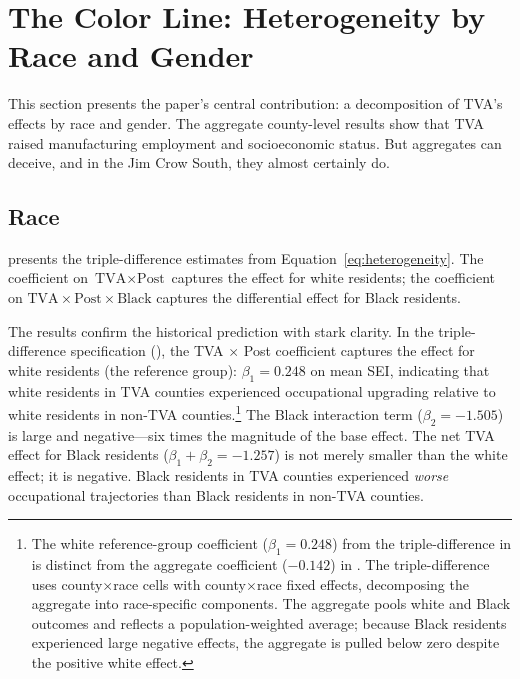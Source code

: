 \documentclass[12pt]{article}
\begin{document}
\section{The Color Line: Heterogeneity by Race and Gender}\label{sec:heterogeneity}

This section presents the paper's central contribution: a decomposition of TVA's effects by race and gender. The aggregate county-level results show that TVA raised manufacturing employment and socioeconomic status. But aggregates can deceive, and in the Jim Crow South, they almost certainly do.

\subsection{Race}

 presents the triple-difference estimates from Equation~\eqref{eq:heterogeneity}. The coefficient on $\text{TVA} \times \text{Post}$ captures the effect for white residents; the coefficient on $\text{TVA} \times \text{Post} \times \text{Black}$ captures the differential effect for Black residents.

The results confirm the historical prediction with stark clarity. In the triple-difference specification (), the TVA $\times$ Post coefficient captures the effect for white residents (the reference group): $\beta_1 = 0.248$ on mean SEI, indicating that white residents in TVA counties experienced occupational upgrading relative to white residents in non-TVA counties.\footnote{The white reference-group coefficient ($\beta_1 = 0.248$) from the triple-difference in  is distinct from the aggregate coefficient ($-0.142$) in . The triple-difference uses county$\times$race cells with county$\times$race fixed effects, decomposing the aggregate into race-specific components. The aggregate pools white and Black outcomes and reflects a population-weighted average; because Black residents experienced large negative effects, the aggregate is pulled below zero despite the positive white effect.} The Black interaction term ($\beta_2 = -1.505$) is large and negative---six times the magnitude of the base effect. The net TVA effect for Black residents ($\beta_1 + \beta_2 = -1.257$) is not merely smaller than the white effect; it is negative. Black residents in TVA counties experienced \emph{worse} occupational trajectories than Black residents in non-TVA counties.
\end{document}
